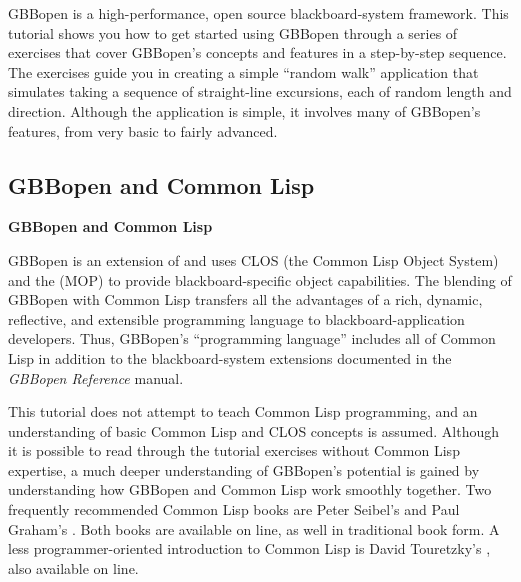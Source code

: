 


GBBopen is a high-performance, open source blackboard-system framework.  This
tutorial shows you how to get started using GBBopen through a series of
exercises that cover GBBopen's concepts and features in a step-by-step
sequence.  The exercises guide you in creating a simple ``random walk''
application that simulates taking a sequence of straight-line excursions, each
of random length and direction.  Although the application is simple, it
involves many of GBBopen's features, from very basic to fairly advanced.

\T\subsection*{GBBopen and Common Lisp}
\W\textbf{\large GBBopen and Common Lisp}

GBBopen is an extension of  and
uses CLOS (the Common Lisp Object System) and the  (MOP) to provide
blackboard-specific object capabilities.  The blending of GBBopen with Common
Lisp transfers all the advantages of a rich, dynamic, reflective, and
extensible programming language to blackboard-application developers.  Thus,
GBBopen's ``programming language'' includes all of Common Lisp in addition to
the blackboard-system extensions documented in the \textit{GBBopen Reference}
manual.

This tutorial does not attempt to teach Common Lisp programming, and an
understanding of basic Common Lisp and CLOS concepts is assumed.  Although it
is possible to read through the tutorial exercises without Common Lisp
expertise, a much deeper understanding of GBBopen's potential is gained by
understanding how GBBopen and Common Lisp work smoothly together.  Two
frequently recommended Common Lisp books are Peter Seibel's
and Paul Graham's .  Both books are available
on line, as well in traditional book form.  A less programmer-oriented
introduction to Common Lisp is David Touretzky's , also available on
line. 

